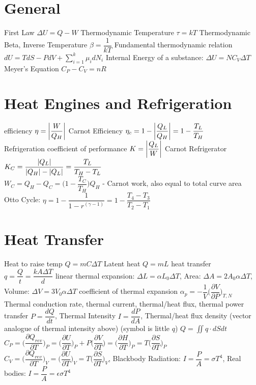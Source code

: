 \documentclass[8pt]{extarticle}
\DeclarePairedDelimiter\abs{\lvert}{\rvert}
\begin{document}
\begin{small}
\section{General} 
First Law $\Delta U=Q-W$ \hspace{.1in} Thermodynamic Temperature $\tau=kT$ \hspace{.1in} Thermodynamic Beta, Inverse Temperature $\beta=\dfrac{1}{kT}$ \hspace{.1in}  Fundamental thermodynamic relation $dU=TdS-PdV+\sum_{i=1}^{k}\mu_idN_i$\hspace{.1in} Internal Energy of a substance: $\Delta U=NC_V\Delta T$\hspace{.1in} Meyer's Equation $C_P-C_V=nR$

\section{Heat Engines and Refrigeration}
efficiency $\eta=\abs*{\dfrac{W}{Q_H}}$ \hspace{.1in} Carnot Efficiency $\eta_c=1-\abs*{\dfrac{Q_L}{Q_H}}=1-\dfrac{T_L}{T_H}$\\
Refrigeration coefficient of performance $K=\abs*{\dfrac{Q_L}{W}}$ \hspace{.1in} Carnot Refrigerator $K_C=\dfrac{\abs*{Q_L}}{\abs*{Q_H}-\abs*{Q_L}}=\dfrac{T_L}{T_H-T_L}$\\
$W_C=Q_H-Q_C=\bigg(1-\dfrac{T_C}{T_H}\bigg)Q_H$ - Carnot work, also equal to total curve area\\
Otto Cycle: $\eta=1-\dfrac{1}{1-r^{(\gamma-1)}}=1-\dfrac{T_4-T_3}{T_2-T_1}$

\section{Heat Transfer}Heat to raise temp $Q=mC\Delta T$ \hspace{.1in} Latent heat $Q=mL$ \hspace{.1in} heat transfer $q=\dfrac{Q}{t}=\dfrac{kA\Delta T}{d}$ \hspace{.1in} linear thermal expansion: $\Delta L=\alpha L_0\Delta T$, Area: $\Delta A=2A_0\alpha\Delta T$, Volume: $\Delta V=3V_0\alpha\Delta T$ \hspace{.1in} coefficient of thermal expansion $\alpha_p=-\dfrac{1}{V}\bigg(\dfrac{\partial V}{\partial P}\bigg)_{T,N}$ Thermal conduction rate, thermal current, thermal/heat flux, thermal power transfer $P=\dfrac{dQ}{dt}$, Thermal Intensity $I=\dfrac{dP}{dA}$, Thermal/heat flux density (vector analogue of thermal intensity above) (symbol is little $q$) $Q=\iint q\cdot dSdt$ \hspace{.1in} $C_P=\bigg(\dfrac{\partial Q_{rev}}{\partial T}\bigg)_P=\bigg(\dfrac{\partial U}{\partial T}\bigg)_P+P\bigg(\dfrac{\partial V}{\partial T}\bigg)=\bigg(\dfrac{\partial H}{\partial T}\bigg)_P=T\bigg(\dfrac{\partial S}{\partial T}\bigg)_P$\hspace{.1in}
 $C_V=\bigg(\dfrac{\partial Q_{rev}}{\partial T}\bigg)_V=\bigg(\dfrac{\partial U}{\partial T}\bigg)_V=T\bigg(\dfrac{\partial S}{\partial T}\bigg)_V$, Blackbody Radiation: $I=\dfrac{P}{A}=\sigma T^4$, Real bodies: $I=\dfrac{P}{A}=\epsilon\sigma T^4$

\end{small}
\end{document}
